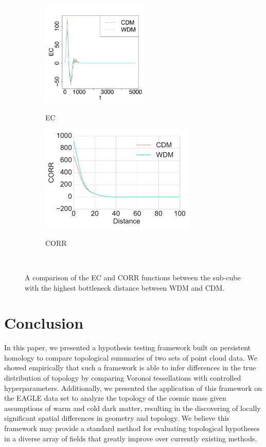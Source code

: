 \documentclass[12pt]{article}
\begin{document}
\begin{figure}[htp!]
  \centering
  \begin{subfigure}{0.48\textwidth}
    \centering
    \caption{EC}
    \includegraphics[height = 2in]{figure_13_maxmin_margin_euler.pdf}
    \label{fig:valid1}
  \end{subfigure}
  \begin{subfigure}{0.48\textwidth}
    \centering
    \caption{CORR}
    \includegraphics[height = 2in]{figure_13_maxmin_margin_corr.pdf}
    \label{fig:valid2}
  \end{subfigure} \\
  \caption{A comparison of the EC and CORR functions between the sub-cube with the highest bottleneck distance between WDM and CDM.}
  \label{fig:validationfigs}
\end{figure}




\section{Conclusion}
\label{sec:conc}
In this paper, we presented a hypothesis testing framework built on persistent homology to compare topological summaries of two sets of point cloud data. We showed empirically that such a framework is able to infer differences in the true distribution of topology by comparing Voronoi tessellations with controlled hyperparameters. Additionally, we presented the application of this framework on the EAGLE data set to analyze the topology of the cosmic mass given assumptions of warm and cold dark matter, resulting in the discovering of locally significant spatial differences in geometry and topology. We believe this framework may provide a standard method for evaluating topological hypotheses in a diverse array of fields that greatly improve over currently existing methods.
\end{document}
